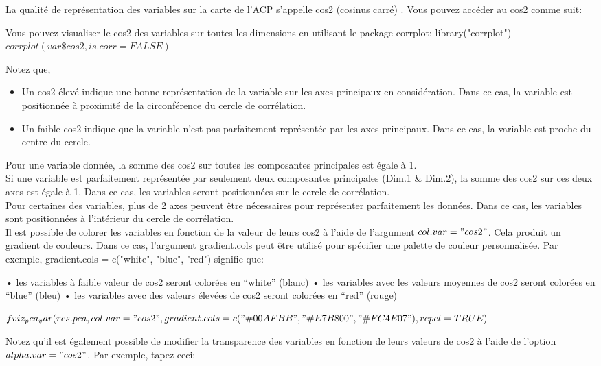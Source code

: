 \documentclass[10pt,a4paper]{report}
\begin{document}
La qualité de représentation des variables sur la carte de l’ACP s’appelle cos2 (cosinus carré) . Vous pouvez accéder au cos2 comme suit:

Vous pouvez visualiser le cos2 des variables sur toutes les dimensions en utilisant le package corrplot:
library("corrplot")
$corrplot(var\$cos2, is.corr=FALSE)$

Notez que,
\begin{itemize}
\item Un cos2 élevé indique une bonne représentation de la variable sur les axes principaux en considération. Dans ce cas, la variable est positionnée à proximité de la circonférence du cercle de corrélation.
\item Un faible cos2 indique que la variable n’est pas parfaitement représentée par les axes principaux. Dans ce cas, la variable est proche du centre du cercle.
\end{itemize}
		
Pour une variable donnée, la somme des cos2 sur toutes les composantes principales est égale à 1.\\
Si une variable est parfaitement représentée par seulement deux composantes principales (Dim.1 \& Dim.2), la somme des cos2 sur ces deux axes est égale à 1. Dans ce cas, les variables seront positionnées sur le cercle de corrélation.\\
Pour certaines des variables, plus de 2 axes peuvent être nécessaires pour représenter parfaitement les données. Dans ce cas, les variables sont positionnées à l’intérieur du cercle de corrélation.\\


Il est possible de colorer les variables en fonction de la valeur de leurs cos2 à l’aide de l’argument $col.var = "cos2"$. Cela produit un gradient de couleurs. Dans ce cas, l’argument gradient.cols peut être utilisé pour spécifier une palette de couleur personnalisée. Par exemple, 
gradient.cols = c("white", "blue", "red") signifie que:

•	les variables à faible valeur de cos2 seront colorées en “white” (blanc)
•	les variables avec les valeurs moyennes de cos2 seront colorées en “blue” (bleu)
•	les variables avec des valeurs élevées de cos2 seront colorées en “red” (rouge)
  
$fviz_pca_var(res.pca, col.var = "cos2",gradient.cols = c("\#00AFBB", \\ "\#E7B800", "\#FC4E07"),repel = TRUE )$

Notez qu’il est également possible de modifier la transparence des variables en fonction de leurs valeurs de cos2 à l’aide de l’option $alpha.var = "cos2"$. Par exemple, tapez ceci:
\end{document}
